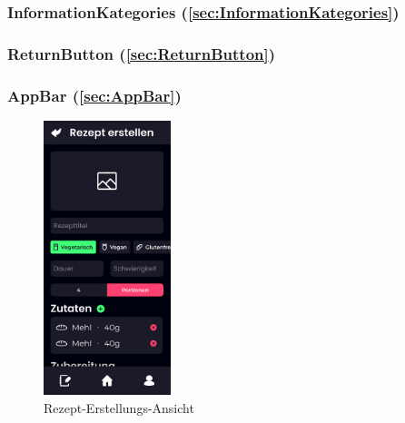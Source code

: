 \documentclass[parskip=full]{scrartcl}
\begin{document}
        \subsubsection*{InformationKategories (\autoref{sec:InformationKategories})}

        \subsubsection*{ReturnButton (\autoref{sec:ReturnButton})}
        
        \subsubsection*{AppBar (\autoref{sec:AppBar})}
            \begin{figure}[htp]
                \begin{minipage}
                    [t]{0.49\textwidth}
                    \centering
                    \includegraphics[height=80mm]{images/Presentation-layer/RecipeCreationView.jpg}
                    \caption{Rezept-Erstellungs-Ansicht}
                \end{minipage}
                \begin{minipage}
                    [t]{0.49\textwidth}
                    \centering

\end{minipage}
\end{figure}
\end{document}
